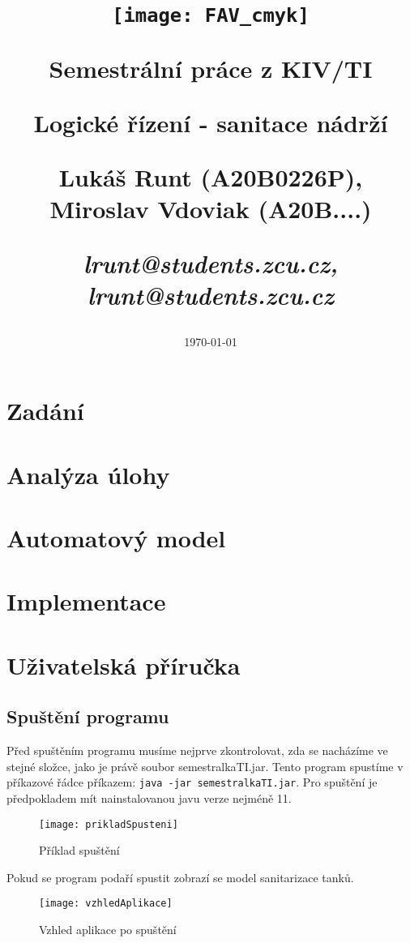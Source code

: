 \documentclass[12pt, a4paper]{article}
\title{\texttt{[image: FAV\_cmyk]}

{\huge Semestrální práce z KIV/TI}

\vspace{0.5cm}
{\LARGE Logické řízení - sanitace nádrží}
\vspace{1cm} 

\Large Lukáš Runt (A20B0226P), Miroslav Vdoviak (A20B....)
\vspace{0.5cm} 

\large \itshape lrunt@students.zcu.cz, lrunt@students.zcu.cz
}
\date{\vspace{6cm} \today}
\begin{document}
\begin{titlepage}
\clearpage\maketitle
\thispagestyle{empty}
\end{titlepage}
\tableofcontents \newpage

\section{Zadání}

\section{Analýza úlohy}

\section{Automatový model}

\section{Implementace}

\newpage
\section{Uživatelská příručka}

\subsection{Spuštění programu}
Před spuštěním programu musíme nejprve zkontrolovat, zda se nacházíme ve stejné složce, jako je právě soubor semestralkaTI.jar. Tento program spustíme v příkazové řádce příkazem: \texttt{java -jar semestralkaTI.jar}. Pro spuštění je předpokladem mít nainstalovanou javu verze nejméně 11.

\begin{figure}[h]
\centering 
\texttt{[image: prikladSpusteni]}
\caption{Příklad spuštění}
\end{figure}

Pokud se program podaří spustit zobrazí se model sanitarizace tanků.

\begin{figure}
\centering 
\texttt{[image: vzhledAplikace]}
\caption{Vzhled aplikace po spuštění}
\end{figure}
\end{document}
